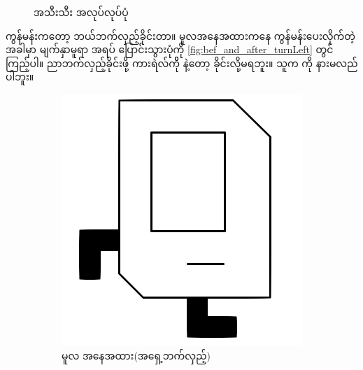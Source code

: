 \begin{sloppypar}
\begin{figure}[tbh!]
    \caption{ \mmcommand အသီးသီး အလုပ်လုပ်ပုံ}
    \label{fig:bef_and_after_commands}
\end{figure}

 ကွန်မန်းကတော့  ဘယ်ဘက်လှည့်ခိုင်းတာ။ မူလအနေအထားကနေ  ကွန်မန်းပေးလိုက်တဲ့ အခါမှာ မျက်နှာမူရာ အရပ် ပြောင်းသွားပုံကို \Fig \vref*{fig:bef_and_after_turnLeft} တွင်ကြည့်ပါ။ ညာဘက်လှည့်ခိုင်းဖို့ ကားရဲလ်ကိို  \mmcommand နဲ့တော့ ခိုင်းလို့မရဘူး။ သူက   \mmcommand ကို နားမလည်ပါဘူး။

\begin{figure}[tbh!]
    \begin{subfigure}[t]{0.4\textwidth}
        \includegraphics[scale=0.2, left]{ch01/karel_icon_E.png}
        \caption{မူလ အနေအထား(အရှေ့ဘက်လှည့်)}    
    \end{subfigure}
    \begin{subfigure}[t]{0.4\textwidth}

\end{subfigure}
\end{figure}
\end{sloppypar}
